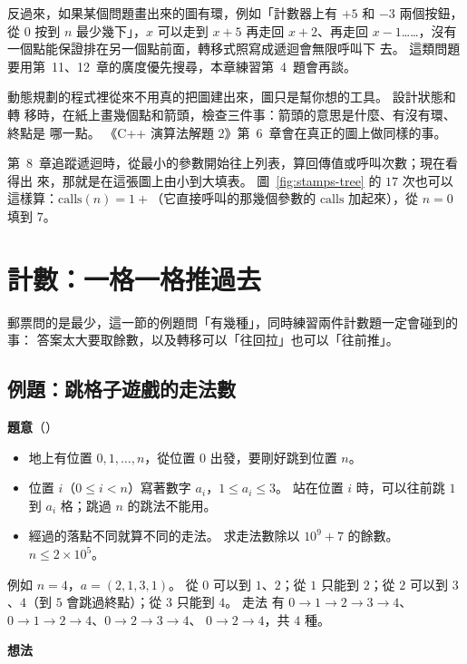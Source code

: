 反過來，如果某個問題畫出來的圖有環，例如「計數器上有 $+5$ 和 $-3$ 兩個按鈕，
從 $0$ 按到 $n$ 最少幾下」，$x$ 可以走到 $x + 5$ 再走回 $x + 2$、再走回
$x - 1$……，沒有一個點能保證排在另一個點前面，轉移式照寫成遞迴會無限呼叫下
去。 這類問題要用第~11、12~章的廣度優先搜尋，本章練習第~4~題會再談。

動態規劃的程式裡從來不用真的把圖建出來，圖只是幫你想的工具。 設計狀態和轉
移時，在紙上畫幾個點和箭頭，檢查三件事：箭頭的意思是什麼、有沒有環、終點是
哪一點。 《C++ 演算法解題 2》第~6~章會在真正的圖上做同樣的事。

第~8~章追蹤遞迴時，從最小的參數開始往上列表，算回傳值或呼叫次數；現在看得出
來，那就是在這張圖上由小到大填表。 圖~\ref{fig:stamps-tree} 的 $17$ 次也可以
這樣算：$\mathrm{calls}(n) = 1 +$（它直接呼叫的那幾個參數的
$\mathrm{calls}$ 加起來），從 $n = 0$ 填到 $7$。

\section{計數：一格一格推過去}
\label{sec:dp1-count}

郵票問的是最少，這一節的例題問「有幾種」，同時練習兩件計數題一定會碰到的事：
答案太大要取餘數，以及轉移可以「往回拉」也可以「往前推」。

\subsection{例題：跳格子遊戲的走法數}
\label{sec:ex-hopscotch}

\textbf{題意}（）

\begin{itemize}
\item 地上有位置 $0, 1, \ldots, n$，從位置 $0$ 出發，要剛好跳到位置 $n$。
\item 位置 $i$（$0 \le i < n$）寫著數字 $a_i$，$1 \le a_i \le 3$。 站在位置
$i$ 時，可以往前跳 $1$ 到 $a_i$ 格；跳過 $n$ 的跳法不能用。
\item 經過的落點不同就算不同的走法。 求走法數除以 $10^9 + 7$ 的餘數。
$n \le 2 \times 10^5$。
\end{itemize}

例如 $n = 4$，$a = (2, 1, 3, 1)$。 從 $0$ 可以到 $1$、$2$；從 $1$ 只能到
$2$；從 $2$ 可以到 $3$、$4$（到 $5$ 會跳過終點）；從 $3$ 只能到 $4$。 走法
有 $0 \to 1 \to 2 \to 3 \to 4$、$0 \to 1 \to 2 \to 4$、$0 \to 2 \to 3 \to 4$、
$0 \to 2 \to 4$，共 $4$ 種。

\textbf{想法}

